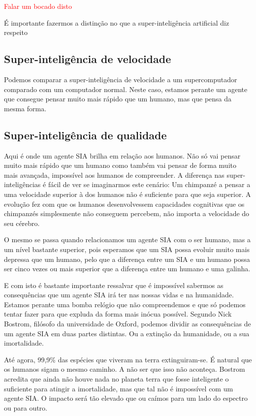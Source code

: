 \documentclass[runningheads,a4paper]{llncs}
\begin{document}
\textcolor{red}{Falar um bocado disto}

É importante fazermos a distinção no que a super-inteligência artificial diz respeito


\subsection{Super-inteligência de velocidade}

Podemos comparar a super-inteligência de velocidade a um supercomputador comparado com um computador normal. Neste caso, estamos perante um agente que consegue pensar muito mais rápido que um humano, mas que pensa da mesma forma.

\subsection{Super-inteligência de qualidade}

Aqui é onde um agente SIA brilha em relação aos humanos. Não só vai pensar muito mais rápido que um humano como também vai pensar de forma muito mais avançada, impossível aos humanos de compreender. A diferença nas super-inteligências é fácil de ver se imaginarmos este cenário: Um chimpanzé a pensar a uma velocidade superior à dos humanos não é suficiente para que seja superior. A evolução fez com que os humanos desenvolvessem capacidades cognitivas que os chimpanzés simplesmente não conseguem percebem, não importa a velocidade do seu cérebro.

O mesmo se passa quando relacionamos um agente SIA com o ser humano, mas a um nível bastante superior, pois esperamos que um SIA possa evoluir muito mais depressa que um humano, pelo que a diferença entre um SIA e um humano possa ser cinco vezes ou mais superior que a diferença entre um humano e uma galinha.

E com isto é bastante importante ressalvar que é impossível sabermos as consequências que um agente SIA irá ter nas nossas vidas e na humanidade. Estamos perante uma bomba relógio que não compreendemos e que só podemos tentar fazer para que expluda da forma mais inócua possível. Segundo Nick Bostrom, filósofo da universidade de Oxford, podemos dividir as consequências de um agente SIA em duas partes distintas. Ou a extinção da humanidade, ou a sua imortalidade.

Até agora, 99,9\% das espécies que viveram na terra extinguiram-se. É natural que os humanos sigam o mesmo caminho. A não ser que isso não aconteça. Bostrom acredita que ainda não houve nada no planeta terra que fosse inteligente o suficiente para atingir a imortalidade, mas que tal não é impossível com um agente SIA\@. O impacto será tão elevado que ou caímos para um lado do espectro ou para outro.
\end{document}
